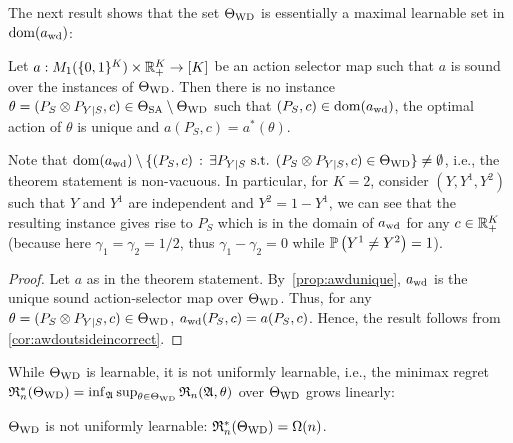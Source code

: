 The next result shows that
the set $\Theta_{\mathrm{WD}}$ is essentially a maximal learnable set in $\mathrm{dom}(a_{\mathrm{wd}})$:
\begin{thm}
Let $a: M_1(\{0,1\}^K) \times \mathbb{R}_+^K \to [K]$ be an action selector map
such that $a$ is sound over the instances of $\Theta_{\mathrm{WD}}$.
Then there is no instance $\theta = (P_S\otimes P_{Y|S},c)\in \Theta_{\mathrm{SA}}\setminus \Theta_{\mathrm{WD}}$ such that 
$(P_S,c)\in \mathrm{dom}(a_{\mathrm{wd}})$, the optimal action of $\theta$ is unique
 and $a(P_S,c) = a^*(\theta)$.
\end{thm}
Note that $\mathrm{dom}(a_{\mathrm{wd}})\setminus \{ (P_S,c) \,:\, \exists P_{Y|S} \textrm{ s.t. } (P_S \otimes P_{Y|S},c) \in \Theta_{\mathrm{WD}} \} \ne \emptyset$, i.e., the theorem statement is non-vacuous.
In particular, for $K=2$, consider $(Y,Y^1,Y^2)$ such that $Y$ and $Y^1$ are independent and $Y^2 = 1-Y^1$, we can see that the resulting instance gives rise to $P_S$ which is in the domain of $a_{\mathrm{wd}}$ for any $c\in \mathbb{R}_+^K$ (because here $\gamma_1 = \gamma_2 = 1/2$, thus $\gamma_1 - \gamma_2 = 0$ while $\mathbb{P}\left(Y^1\ne Y^2\right)=1$).
\begin{proof}
Let $a$ as in the theorem statement. By~\cref{prop:awdunique}, $a_{\mathrm{wd}}$ is the unique sound action-selector map over $\Theta_{\mathrm{WD}}$.
Thus, for any $\theta = (P_S\otimes P_{Y|S},c)\in \Theta_{\mathrm{WD}}$, $a_{\mathrm{wd}}(P_S,c) = a(P_S,c)$.
Hence, the result follows from \cref{cor:awdoutsideincorrect}.
\end{proof}
While $\Theta_{\mathrm{WD}}$ is learnable, it is not uniformly learnable, i.e., the minimax regret $\mathfrak{R}_n^*(\Theta_{\mathrm{WD}}) = \inf_{\mathfrak{A}} \sup_{\theta\in \Theta_{\mathrm{WD}}} \mathfrak{R}_n(\mathfrak{A},\theta)$ over $\Theta_{\mathrm{WD}}$ grows linearly:
\begin{thm}
\label{thm:nonunif}
$\Theta_{\mathrm{WD}}$ is not uniformly learnable:
$\mathfrak{R}_n^*(\Theta_{\mathrm{WD}}) = \Omega(n)$.
\end{thm}
